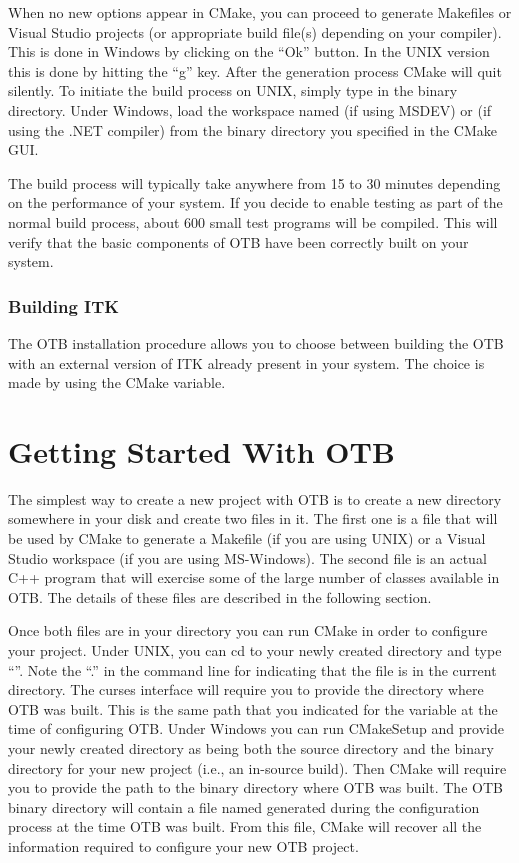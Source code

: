 When no new options appear in CMake, you can proceed to generate Makefiles or
Visual Studio projects (or appropriate build file(s) depending on your
compiler). This is done in Windows by clicking on the ``Ok'' button.  In the
UNIX version this is done by hitting the ``g'' key. After the generation
process CMake will quit silently. To initiate the build process on UNIX,
simply type  in the binary directory. Under Windows, load the
workspace named  (if using MSDEV) or  (if using
the .NET compiler) from the binary directory you specified in the CMake GUI.

The build process will typically take anywhere from 15 to 30 minutes depending
on the performance of your system. If you decide to enable testing as part of
the normal build process, about 600 small test programs will be compiled. This
will verify that the basic components of OTB have been correctly built on your
system.

\subsubsection{Building ITK}

The OTB installation procedure allows you to choose between building
the OTB with an external version of ITK already present in your
system. The choice is made by using the 
CMake variable.

\section{Getting Started With OTB }
\label{sec:GettingStartedWithOTB}

The simplest way to create a new project with OTB is to create a new directory
somewhere in your disk and create two files in it. The first one is a
 file that will be used by CMake to generate a Makefile
(if you are using UNIX) or a Visual Studio workspace (if you are using
MS-Windows).  The second file is an actual C++ program that will exercise
some of the large number of classes available in OTB. The details of these files
are described in the following section.

Once both files are in your directory you can run CMake in order to configure
your project. Under UNIX, you can cd to your newly created directory
and type ``''. Note the ``.'' in the command line for indicating
that the  file is in the current directory. The
curses interface will require you to provide the directory where OTB
was built. This is the same path that you indicated for the
 variable at the time of configuring OTB. Under
Windows you can run CMakeSetup and provide your newly created
directory as being both the source directory and the binary directory for
your new project (i.e., an in-source build). Then CMake will require you to
provide the path to the binary directory where OTB was built. The OTB binary
directory will contain a file named  generated during the
configuration process at the time OTB was built.  From this file, CMake will
recover all the information required to configure your new OTB project.


